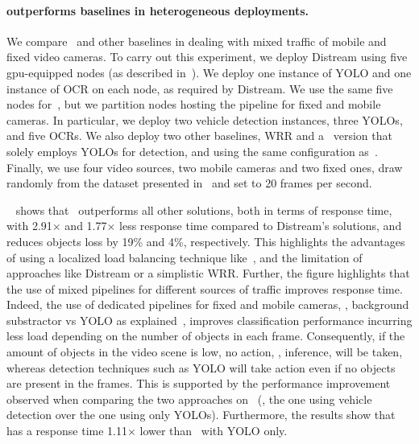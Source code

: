 \paragraph{\videojam{} outperforms baselines in heterogeneous deployments.} We compare~\videojam{} and other baselines in dealing with mixed traffic of mobile and fixed video cameras. To carry out this experiment, we deploy Distream using five \acrshort{gpu}-equipped nodes (as described in~). We deploy one instance of YOLO and one instance of OCR on each node, as required by Distream. We use the same five nodes for~\videojam{}, but we partition nodes hosting the pipeline for fixed and mobile cameras. In particular, we deploy two vehicle detection instances, three YOLOs, and five OCRs. We also deploy two other baselines, WRR and a~\videojam{} version that solely employs YOLOs for detection, and using the same configuration as~\videojam{}. Finally, we use four video sources, two mobile cameras and two fixed ones, draw randomly from the dataset presented in~ and set to 20 frames per second. 

~ shows that~\videojam{} outperforms all other solutions, both in terms of response time, with 2.91$\times$ and 1.77$\times$ less response time compared to Distream's solutions, and reduces objects loss by 19\% and 4\%, respectively. This highlights the advantages of using a localized load balancing technique like~\videojam{}, and the limitation of approaches like Distream or a simplistic WRR. Further, the figure highlights that the use of mixed pipelines for different sources of traffic improves response time.  Indeed, the use of dedicated pipelines for fixed and mobile cameras, \ie, background substractor vs YOLO as explained~, improves classification performance incurring less load depending on the number of objects in each frame. Consequently, if the amount of objects in the video scene is low, no action, \ie, inference, will be taken, whereas detection techniques such as YOLO will take action even if no objects are present in the frames. This is supported by the performance improvement observed when comparing the two approaches on~\videojam{} (\ie, the one using vehicle detection over the one using only YOLOs). Furthermore, the results show that~\videojam{} has a response time 1.11$\times$
lower than~\videojam{} with YOLO only.

